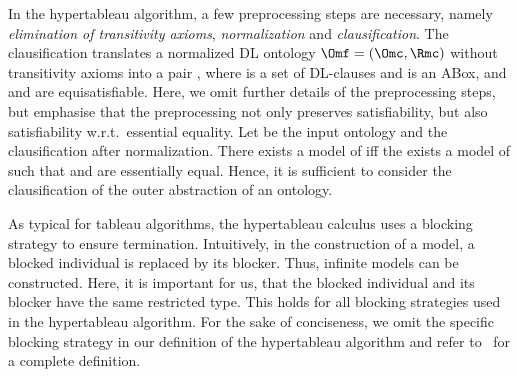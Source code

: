 In the hypertableau algorithm, a few preprocessing steps are necessary, namely \emph{elimination of
  transitivity axioms}, \emph{normalization} and \emph{clausification}. The clausification
translates a normalized DL ontology $\Omf = (\Omc, \Rmc)$ without transitivity axioms into a pair
\CA, where \Cmc is a set of DL-clauses and \A is an ABox, and \Omf and \CA are equisatisfiable.
Here, we omit further details of the preprocessing steps, but emphasise that the preprocessing not
only preserves satisfiability, but also satisfiability w.r.t.~essential equality.  Let \Kmc be the
input ontology and \CA the clausification after normalization. There exists a model \I of \Kmc iff
the exists a model \Hmc of \CA such that \I and \Hmc are essentially equal. Hence, it is sufficient
to consider the clausification of the outer abstraction of an \LMLO ontology.

As typical for tableau algorithms, the hypertableau calculus uses a blocking strategy to ensure
termination. Intuitively, in the construction of a model, a blocked individual is replaced by its
blocker. Thus, infinite models can be constructed. Here, it is important for us, that the blocked
individual and its blocker have the same restricted type. This holds for all blocking strategies
used in the hypertableau algorithm. For the sake of conciseness, we omit the specific blocking
strategy in our definition of the hypertableau algorithm and refer to~\cite{MoSH-JAIR09} for a
complete definition.

